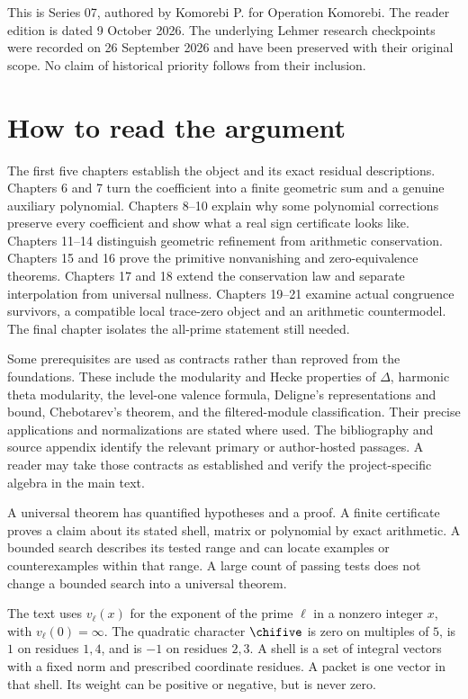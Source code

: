 This is Series 07, authored by Komorebi P. for Operation Komorebi. The reader edition is dated 9 October 2026. The underlying Lehmer research checkpoints were recorded on 26 September 2026 and have been preserved with their original scope. No claim of historical priority follows from their inclusion.

\chapter*{How to read the argument}
The first five chapters establish the object and its exact residual descriptions. Chapters 6 and 7 turn the coefficient into a finite geometric sum and a genuine auxiliary polynomial. Chapters 8--10 explain why some polynomial corrections preserve every coefficient and show what a real sign certificate looks like. Chapters 11--14 distinguish geometric refinement from arithmetic conservation. Chapters 15 and 16 prove the primitive nonvanishing and zero-equivalence theorems. Chapters 17 and 18 extend the conservation law and separate interpolation from universal nullness. Chapters 19--21 examine actual congruence survivors, a compatible local trace-zero object and an arithmetic countermodel. The final chapter isolates the all-prime statement still needed.

Some prerequisites are used as contracts rather than reproved from the foundations. These include the modularity and Hecke properties of $\Delta$, harmonic theta modularity, the level-one valence formula, Deligne's representations and bound, Chebotarev's theorem, and the filtered-module classification. Their precise applications and normalizations are stated where used. The bibliography and source appendix identify the relevant primary or author-hosted passages. A reader may take those contracts as established and verify the project-specific algebra in the main text.

\begin{resultbox}
A universal theorem has quantified hypotheses and a proof. A finite certificate proves a claim about its stated shell, matrix or polynomial by exact arithmetic. A bounded search describes its tested range and can locate examples or counterexamples within that range. A large count of passing tests does not change a bounded search into a universal theorem.
\end{resultbox}

The text uses $v_\ell(x)$ for the exponent of the prime $\ell$ in a nonzero integer $x$, with $v_\ell(0)=\infty$. The quadratic character $\chifive$ is zero on multiples of $5$, is $1$ on residues $1,4$, and is $-1$ on residues $2,3$. A shell is a set of integral vectors with a fixed norm and prescribed coordinate residues. A packet is one vector in that shell. Its weight can be positive or negative, but is never zero.

